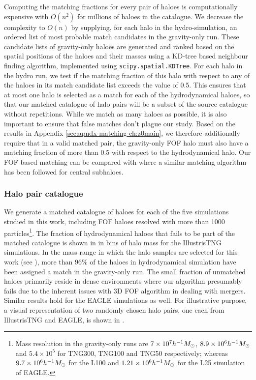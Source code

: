 Computing the matching fractions 
for every pair of haloes is computationally expensive with $O(n^2)$ for millions of haloes in the catalogue. We decrease the complexity to $O(n)$ by supplying, for each halo in the hydro-simulation, an ordered list of most probable match candidates in the gravity-only run. These candidate lists of gravity-only haloes are generated and ranked based on the spatial positions of the haloes and their masses using a KD-tree based neighbour finding algorithm, implemented using \texttt{scipy.spatial.KDTree}.
For each halo in the hydro run, we test if the matching fraction of this halo with respect to any of the haloes in its match candidate list exceeds the value of 0.5. This ensures that at most one halo is selected as a match for each of the hydrodynamical haloes, so that our matched catalogue of halo pairs will be a subset of the source catalogue without repetitions.
While we match as many haloes as possible, it is also important to ensure that false matches don't plague our study. Based on the results in Appendix \ref{sec:apndx-matching-ch:z0main}, we therefore additionally require that in a valid matched pair, the gravity-only FOF halo must also have a matching fraction of more than 0.5 with respect to the hydrodynamical halo.
Our FOF based matching can be compared with
\citet[][]{2018MNRAS.481.1950L} where a similar matching algorithm has been followed for central subhaloes.

\subsubsection{Halo pair catalogue}
We generate a matched catalogue of haloes for each of the five simulations studied in this work, including FOF haloes resolved with more than 1000 particles\footnote{Mass resolution in the gravity-only runs are $7 \times 10^7 h^{-1}M_{\odot}$, $8.9 \times 10^6 h^{-1}M_{\odot}$ and $5.4 \times 10^5$ for TNG300, TNG100 and TNG50 respectively; whereas $9.7 \times 10^6 h^{-1}M_{\odot}$ for the L100 and $1.21 \times 10^6 h^{-1}M_{\odot}$ for the L25 simulation of EAGLE.}. The fraction of hydrodynamical haloes that fails to be part of the matched catalogue is shown in  in bins of halo mass for the IllustrisTNG simulations. %
In the mass range in which the halo samples are selected for this work (see ), more than 96\% of the haloes in hydrodynamical simulation have been assigned a match in the gravity-only run. The small fraction of unmatched haloes primarily reside in dense environments 
where our algorithm presumably fails due to
the inherent issues with 3D FOF algorithm in dealing with mergers. Similar results hold for the EAGLE simulations as well. 
For illustrative purpose, a visual representation of two randomly chosen halo pairs, one each from IllustrisTNG and EAGLE, is shown in . 










